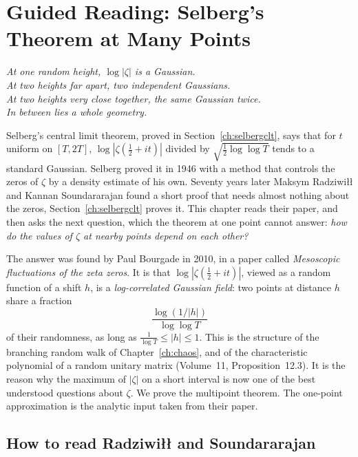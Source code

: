 \chapter{Guided Reading: Selberg's Theorem at Many Points}
\label{ch:selberg}

\begin{center}\itshape
At one random height, $\log|\zeta|$ is a Gaussian.\\
At two heights far apart, two independent Gaussians.\\
At two heights very close together, the same Gaussian twice.\\
In between lies a whole geometry.
\end{center}

Selberg's central limit theorem, proved in Section~\ref{ch:selbergclt}, says that for $t$ uniform on $[T,2T]$, $\log|\zeta(\frac12+it)|$ divided by $\sqrt{\frac12\log\log T}$ tends to a standard Gaussian. Selberg proved it in 1946 with a method that controls the zeros of $\zeta$ by a density estimate of his own. Seventy years later Maksym Radziwi\l\l{} and Kannan Soundararajan found a short proof that needs almost nothing about the zeros, Section~\ref{ch:selbergclt} proves it. This chapter reads their paper, and then asks the next question, which the theorem at one point cannot answer: \emph{how do the values of $\zeta$ at nearby points depend on each other?}

The answer was found by Paul Bourgade in 2010, in a paper called \emph{Mesoscopic fluctuations of the zeta zeros}. It is that $\log|\zeta(\frac12+it)|$, viewed as a random function of a shift $h$, is a \emph{log-correlated Gaussian field}: two points at distance $h$ share a fraction
\[
\frac{\log(1/|h|)}{\log\log T}
\]
of their randomness, as long as $\frac1{\log T}\le|h|\le1$. This is the structure of the branching random walk of Chapter~\ref{ch:chaos}, and of the characteristic polynomial of a random unitary matrix (Volume~11, Proposition~12.3). It is the reason why the maximum of $|\zeta|$ on a short interval is now one of the best understood questions about $\zeta$. We prove the multipoint theorem. The one-point approximation is the analytic input taken from their paper.

\section{How to read Radziwi\l\l{} and Soundararajan}

